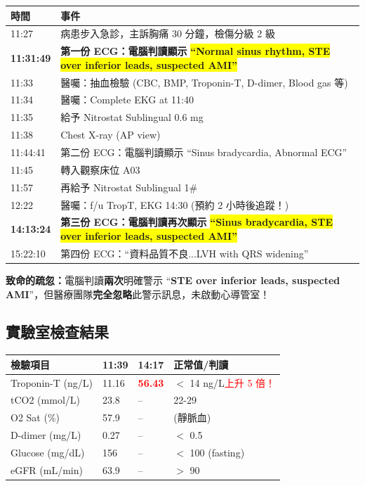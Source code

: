 \documentclass[12pt,a4paper]{article}
\begin{document}
\begin{longtable}{p{2.5cm}p{11.5cm}}
\toprule
\textbf{時間} & \textbf{事件} \\
\midrule
\endhead
11:27 & 病患步入急診，主訴胸痛 30 分鐘，檢傷分級 2 級 \\
\midrule
\rowcolor{red!20}
\textbf{11:31:49} & \textbf{第一份 ECG：電腦判讀顯示}\newline
\colorbox{yellow}{\textbf{``Normal sinus rhythm, STE over inferior leads, suspected AMI''}} \\
\midrule
11:33 & 醫囑：抽血檢驗 (CBC, BMP, Troponin-T, D-dimer, Blood gas 等) \\
\midrule
11:34 & 醫囑：Complete EKG at 11:40 \\
\midrule
11:35 & 給予 Nitrostat Sublingual 0.6 mg \\
\midrule
11:38 & Chest X-ray (AP view) \\
\midrule
11:44:41 & 第二份 ECG：電腦判讀顯示 ``Sinus bradycardia, Abnormal ECG'' \\
\midrule
11:45 & 轉入觀察床位 A03 \\
\midrule
11:57 & 再給予 Nitrostat Sublingual 1\# \\
\midrule
12:22 & 醫囑：f/u TropT, EKG 14:30 (預約 2 小時後追蹤！) \\
\midrule
\rowcolor{red!20}
\textbf{14:13:24} & \textbf{第三份 ECG：電腦判讀再次顯示}\newline
\colorbox{yellow}{\textbf{``Sinus bradycardia, STE over inferior leads, suspected AMI''}} \\
\midrule
15:22:10 & 第四份 ECG：``資料品質不良...LVH with QRS widening'' \\
\bottomrule
\end{longtable}

\begin{alertbox}
\textbf{致命的疏忽：}電腦判讀\textbf{兩次}明確警示 ``\textbf{STE over inferior leads, suspected AMI}''，但醫療團隊\textbf{完全忽略}此警示訊息，未啟動心導管室！
\end{alertbox}

\newpage
\subsection{實驗室檢查結果}

\begin{longtable}{p{3cm}p{3cm}p{3cm}p{4cm}}
\toprule
\textbf{檢驗項目} & \textbf{11:39} & \textbf{14:17} & \textbf{正常值/判讀} \\
\midrule
\endhead
Troponin-T (ng/L) & 11.16 & \textcolor{red}{\textbf{56.43}} & $<$ 14 ng/L\newline\textcolor{red}{上升 5 倍！} \\
\midrule
tCO2 (mmol/L) & 23.8 & -- & 22-29 \\
\midrule
O2 Sat (\%) & 57.9 & -- & (靜脈血) \\
\midrule
D-dimer (mg/L) & 0.27 & -- & $<$ 0.5 \\
\midrule
Glucose (mg/dL) & 156 & -- & $<$ 100 (fasting) \\
\midrule
eGFR (mL/min) & 63.9 & -- & $>$ 90 \\
\bottomrule
\end{longtable}
\end{document}
